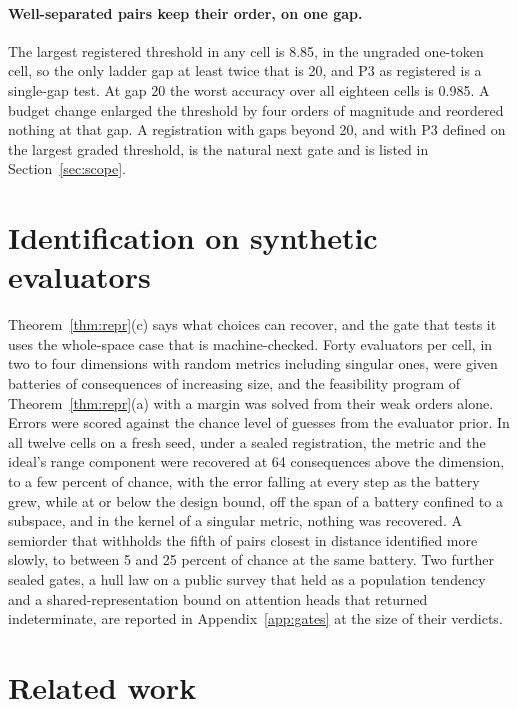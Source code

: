 \documentclass{article}
\theoremstyle{definition}
\theoremstyle{remark}
\begin{document}
\paragraph{Well-separated pairs keep their order, on one gap.}
The largest registered threshold in any cell is 8.85, in the ungraded one-token cell, so the only ladder gap at least twice that is 20, and P3 as registered is a single-gap test.
At gap 20 the worst accuracy over all eighteen cells is 0.985.
A budget change enlarged the threshold by four orders of magnitude and reordered nothing at that gap.
A registration with gaps beyond 20, and with P3 defined on the largest graded threshold, is the natural next gate and is listed in Section~\ref{sec:scope}.

\section{Identification on synthetic evaluators}
\label{sec:gates}

Theorem~\ref{thm:repr}(c) says what choices can recover, and the gate that tests it uses the whole-space case that is machine-checked.
Forty evaluators per cell, in two to four dimensions with random metrics including singular ones, were given batteries of consequences of increasing size, and the feasibility program of Theorem~\ref{thm:repr}(a) with a margin was solved from their weak orders alone.
Errors were scored against the chance level of guesses from the evaluator prior.
In all twelve cells on a fresh seed, under a sealed registration, the metric and the ideal's range component were recovered at 64 consequences above the dimension, to a few percent of chance, with the error falling at every step as the battery grew, while at or below the design bound, off the span of a battery confined to a subspace, and in the kernel of a singular metric, nothing was recovered.
A semiorder that withholds the fifth of pairs closest in distance identified more slowly, to between 5 and 25 percent of chance at the same battery.
Two further sealed gates, a hull law on a public survey that held as a population tendency and a shared-representation bound on attention heads that returned indeterminate, are reported in Appendix~\ref{app:gates} at the size of their verdicts.

\section{Related work}
\label{sec:related}
\end{document}
